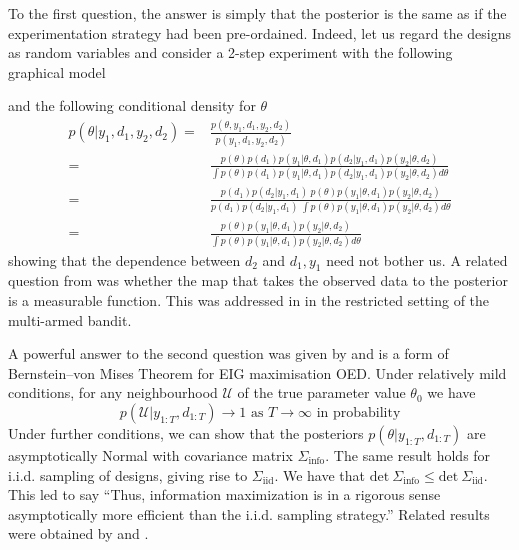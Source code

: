 To the first question, the answer is simply that the posterior is the same as if the experimentation strategy had been pre-ordained. Indeed, let us regard the designs as random variables and consider a 2-step experiment with the following graphical model
\begin{center}
\end{center}
and the following conditional density for $\theta$
\begin{align}
	p(\theta | y_1, d_1, y_2, d_2) =& \frac{p(\theta, y_1, d_1, y_2, d_2)}{p(y_1, d_1, y_2, d_2)} \\
	=& \frac{p(\theta)p(d_1)p(y_1|\theta, d_1)p(d_2|y_1,d_1)p(y_2|\theta,d_2)}{\int p(\theta)p(d_1)p(y_1|\theta, d_1)p(d_2|y_1,d_1)p(y_2|\theta,d_2) d\theta} \\
	=& \frac{p(d_1)p(d_2|y_1,d_1)\ p(\theta)p(y_1|\theta, d_1)p(y_2|\theta,d_2)}{p(d_1)p(d_2|y_1,d_1)\ \int p(\theta)p(y_1|\theta, d_1)p(y_2|\theta,d_2) d\theta} \\
	=& \frac{p(\theta)p(y_1|\theta, d_1)p(y_2|\theta,d_2)}{\int p(\theta)p(y_1|\theta, d_1)p(y_2|\theta,d_2) d\theta}
\end{align}
showing that the dependence between $d_2$ and $d_1, y_1$ need not bother us. A related question from \cite{berry1985} was whether the map that takes the observed data to the posterior is a measurable function. This was addressed in \cite[pp. 18-20]{berry1985} in the restricted setting of the multi-armed bandit.

A powerful answer to the second question was given by \cite{paninski2005} and is a form of Bernstein--von Mises Theorem for EIG maximisation OED. Under relatively mild conditions, for any neighbourhood $\mathcal{U}$ of the true parameter value $\theta_0$ we have
\begin{equation}
	p(\mathcal{U} | y_{1:T}, d_{1:T}) \to 1 \text{ as } T \to \infty \text{ in probability}
\end{equation}
Under further conditions, we can show that the posteriors $p(\theta | y_{1:T}, d_{1:T})$ are asymptotically Normal with covariance matrix $\Sigma_\text{info}$. The same result holds for i.i.d. sampling of designs, giving rise to $\Sigma_\text{iid}$. We have that $\text{det}\ \Sigma_\text{info} \le \text{det}\ \Sigma_\text{iid}$. This led \cite{paninski2005} to say ``Thus, information maximization is in a rigorous sense asymptotically more efficient than the i.i.d. sampling strategy.'' Related results were obtained by \cite{pronzato2010} and \cite{hu1998}.

